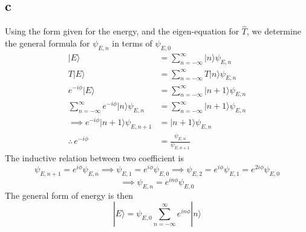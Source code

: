 \documentclass[letter]{article}
\begin{document}
\subsection*{c} 
Using the form given for the energy, and the eigen-equation for $\hat{T}$, we determine the general formula for $\psi_{E,n}$ in terms of $\psi_{E,0}$
\begin{align*}
	| E \rangle  &= \sum_{n=-\infty}^{\infty} | n \rangle \psi_{E,n} \\ 
	T | E \rangle  &= \sum_{n=-\infty}^{\infty} T | n \rangle \psi_{E,n}\\ 
	e^{-i \phi} | E \rangle 	       &= \sum_{n=-\infty}^{\infty} | n+1 \rangle \psi_{E,n} \\ 
	\sum_{n=-\infty}^{\infty} e^{-i \phi} | n \rangle \psi_{E,n} &= \sum_{n=-\infty}^{\infty} | n+1 \rangle \psi_{E,n} \\ 
	\implies e^{-i \phi} | n+1 \rangle \psi_{E,n+1} &= | n+1 \rangle \psi_{E,n} \\ 
	\therefore \, e^{-i \phi} &= \frac{\psi_{E, n}}{\psi_{E,n+1}}
\end{align*}
The inductive relation between two coefficient is 
\[
	\psi_{E, n+1} = e^{ i \phi} \psi_{E,n} \implies \psi_{E, 1} = e^{i \phi} \psi_{E,0} \implies
	\psi_{E, 2} = e^{i \phi} \psi_{E, 1} = e^{2 i \phi } \psi_{E,0}
\]
\[
	\implies \psi_{E,n} = e^{i n \phi} \psi_{E,0} 
\]
The general form of energy is then 
\[
	| E \rangle  =  \psi_{E,0} \sum_{n=-\infty}^{\infty} e^{i n \phi} | n \rangle 
\] 
\end{document}
